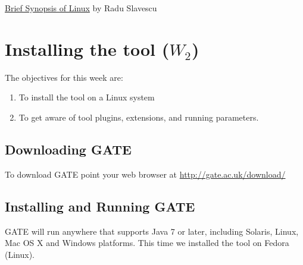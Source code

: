 \documentclass[a4paper,12pt]{report}
\begin{document}
\href{http://cs-gw.utcluj.ro/~srazvan/articleSchema.tgz}{Brief Synopsis of Linux} by Radu Slavescu


\chapter{Installing the tool ($W_2$)}
The objectives for this week are:
\begin{enumerate}
 \item To install the tool on a Linux system
\item To get aware of tool plugins, extensions, and running parameters.
\end{enumerate}

\section{Downloading GATE}
To download GATE point your web browser at \href{http://gate.ac.uk/download/}{http://gate.ac.uk/download/}

\section{Installing and Running GATE}
GATE will run anywhere that supports Java 7 or later, including Solaris, Linux, Mac OS
X and Windows platforms.  This time we installed the tool on Fedora (Linux). \\
\end{document}
